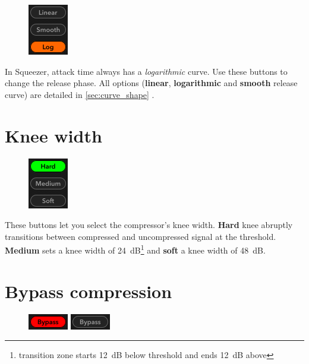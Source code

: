 \begin{figure}
  \includegraphics[scale=\screenshotscale,clip]{include/images/buttons_release_curve.png}
\end{figure}

In Squeezer, attack time always has a \emph{logarithmic} curve.  Use
these buttons to change the release phase.  All options
(\textbf{linear}, \textbf{logarithmic} and \textbf{smooth} release
curve) are detailed in \ref{sec:curve_shape} .

\section{Knee width}

\begin{figure}
  \includegraphics[scale=\screenshotscale,clip]{include/images/buttons_knee_width.png}
\end{figure}

These buttons let you select the compressor's knee width.
\textbf{Hard} knee abruptly transitions between compressed and
uncompressed signal at the threshold.  \textbf{Medium} sets a knee
width of \SI{24}{\dB}\footnote{transition zone starts \SI{12}{\dB}
  below threshold and ends \SI{12}{\dB} above} and \textbf{soft} a
knee width of \SI{48}{\dB}.

\section{Bypass compression}

\begin{figure}
  \includegraphics[scale=\screenshotscale,clip]{include/images/button_bypass_on.png}
  \newline \vspace{-0.9\baselineskip}
  \includegraphics[scale=\screenshotscale,clip]{include/images/button_bypass_off.png}
\end{figure}

